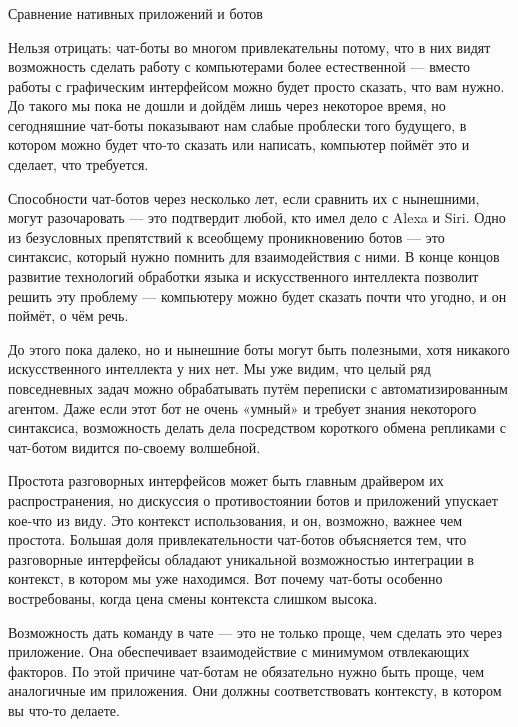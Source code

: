 \subsubsection{} Сравнение нативных приложений и ботов
\label{sec:analysis:literature:botsvsnative}

Нельзя отрицать: чат-боты во многом привлекательны потому, что в них видят возможность сделать работу с компьютерами более естественной — вместо работы с графическим интерфейсом можно будет просто сказать, что вам нужно. До такого мы пока не дошли и дойдём лишь через некоторое время, но сегодняшние чат-боты показывают нам слабые проблески того будущего, в котором можно будет что-то сказать или написать, компьютер поймёт это и сделает, что требуется.

Способности чат-ботов через несколько лет, если сравнить их с нынешними, могут разочаровать — это подтвердит любой, кто имел дело с Alexa и Siri. Одно из безусловных препятствий к всеобщему проникновению ботов — это синтаксис, который нужно помнить для взаимодействия с ними. В конце концов развитие технологий обработки языка и искусственного интеллекта позволит решить эту проблему — компьютеру можно будет сказать почти что угодно, и он поймёт, о чём речь.

До этого пока далеко, но и нынешние боты могут быть полезными, хотя никакого искусственного интеллекта у них нет. Мы уже видим, что целый ряд повседневных задач можно обрабатывать путём переписки с автоматизированным агентом. Даже если этот бот не очень «умный» и требует знания некоторого синтаксиса, возможность делать дела посредством короткого обмена репликами с чат-ботом видится по-своему волшебной.

Простота разговорных интерфейсов может быть главным драйвером их распространения, но дискуссия о противостоянии ботов и приложений упускает кое-что из виду. Это контекст использования, и он, возможно, важнее чем простота. Большая доля привлекательности чат-ботов объясняется тем, что разговорные интерфейсы обладают уникальной возможностью интеграции в контекст, в котором мы уже находимся. Вот почему чат-боты особенно востребованы, когда цена смены контекста слишком высока.

Возможность дать команду в чате — это не только проще, чем сделать это через приложение. Она обеспечивает взаимодействие с минимумом отвлекающих факторов. По этой причине чат-ботам не обязательно нужно быть проще, чем аналогичные им приложения. Они должны соответствовать контексту, в котором вы что-то делаете.


